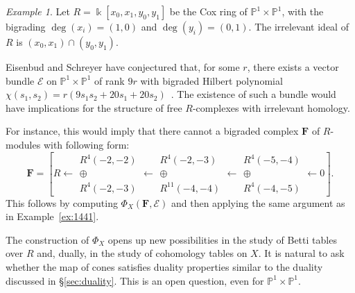 \documentclass[12pt]{amsart}
\theoremstyle{definition}
\theoremstyle{remark}
\newtheorem{example}[lemma]{Example}
\newcommand{\kk}{\Bbbk}
\newcommand{\PP}{\mathbb{P}}
\newcommand{\cE}{\mathcal{E}}
\newcommand{\FF}{\mathbf{F}}
\begin{document}
\begin{example}
Let $R=\kk[x_0,x_1,y_0,y_1]$ be the Cox ring of $\PP^1\times \PP^1$, with the bigrading $\deg(x_i)=(1,0)$ and $\deg(y_i)=(0,1)$.  The irrelevant ideal of $R$ is $(x_0,x_1)\cap (y_0,y_1)$.  

Eisenbud and Schreyer have conjectured that, for some $r$, there exists a vector bundle $\cE$ on $\PP^1\times \PP^1$ of rank $9r$ with bigraded Hilbert polynomial $\chi(s_1,s_2)=r(9s_1s_2+20s_1+20s_2)$~\cite[Conjecture 2]{eis-schrey-abel}.  The existence of such a bundle would have implications for the structure of free $R$-complexes with irrelevant homology.  

For instance, this would imply that there cannot a bigraded complex $\FF$ of $R$-modules with following form:
\[
\FF
=\left[
R\gets 
\begin{matrix}
R^4(-2,-2)
\\
\oplus
\\
R^4(-2,-3)
\end{matrix}
\gets
\begin{matrix}
R^4(-2,-3)
\\
\oplus
\\
R^{11}(-4,-4)
\end{matrix}
\gets
\begin{matrix}
R^4(-5,-4)
\\
\oplus
\\
R^4(-4,-5)
\end{matrix}
\gets
0
\right].
\]
This follows by computing $\Phi_X(\FF, \cE)$ and then applying the same argument as in Example~\ref{ex:1441}.
\end{example}


The construction of $\Phi_X$ opens up new possibilities in the study of Betti tables over $R$ and, dually, in the study of cohomology tables on $X$.  
It is natural to ask whether
the map of cones satisfies duality properties similar to the duality discussed in \S\ref{sec:duality}.  This is an open question, even for $\PP^1\times \PP^1$.
\end{document}
